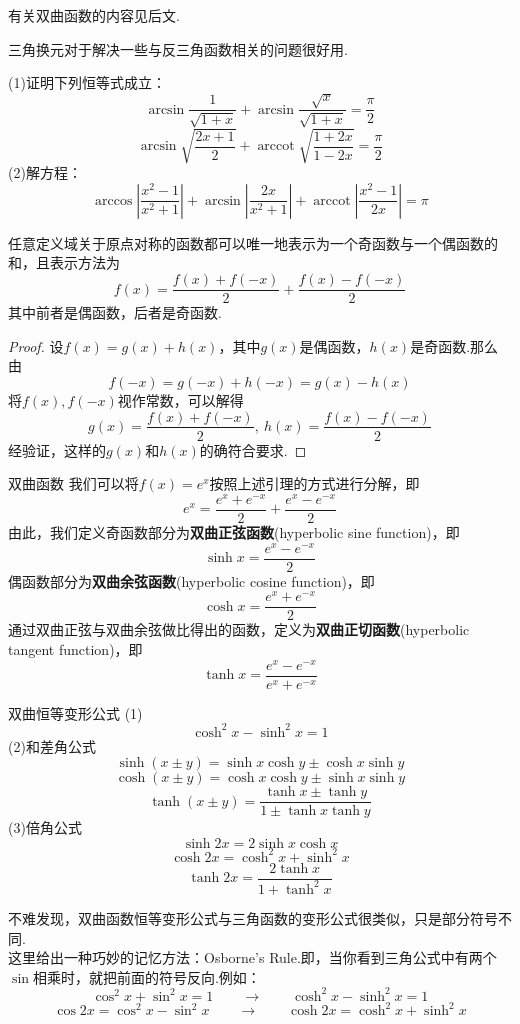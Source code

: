 \documentclass[lang=cn, zihao=5]{elegantbook}
\DeclareMathOperator{\arccot}{arccot}
\begin{document}
\begin{remark}
	有关双曲函数的内容见后文.
\end{remark}

三角换元对于解决一些与反三角函数相关的问题很好用.

\begin{example}
	(1)证明下列恒等式成立：
	$$\arcsin \frac{1}{\sqrt{1+x}} + \arcsin \frac{\sqrt{x}}{\sqrt{1+x}} = \frac{\pi}{2}$$
	$$\arcsin \sqrt{\frac{2x+1}{2}} + \arccot \sqrt{\frac{1+2x}{1-2x}} = \frac{\pi}{2}$$
	(2)解方程：$$\arccos \left| \frac{x^2-1}{x^2+1} \right| + \arcsin \left| \frac{2x}{x^2+1} \right| + \arccot \left| \frac{x^2-1}{2x} \right| = \pi$$
\end{example}

\begin{lemma}
    任意定义域关于原点对称的函数都可以唯一地表示为一个奇函数与一个偶函数的和，且表示方法为$$f(x)=\frac{f(x)+f(-x)}{2}+\frac{f(x)-f(-x)}{2}$$
    其中前者是偶函数，后者是奇函数.
\end{lemma}
\begin{proof}
    设$f(x)=g(x)+h(x)$，其中$g(x)$是偶函数，$h(x)$是奇函数.那么由$$f(-x) = g(-x) + h(-x) = g(x) - h(x)$$
    将$f(x),f(-x)$视作常数，可以解得$$g(x) = \frac{f(x)+f(-x)}{2},~h(x) = \frac{f(x)-f(-x)}{2}$$
    经验证，这样的$g(x)$和$h(x)$的确符合要求.
\end{proof}

\begin{definition}{双曲函数}
    我们可以将$f(x)=e^x$按照上述引理的方式进行分解，即$$e^x=\frac{e^x+e^{-x}}{2}+\frac{e^x-e^{-x}}{2}$$
    由此，我们定义奇函数部分为\textbf{双曲正弦函数}(hyperbolic sine function)，即$$\sinh{x}=\frac{e^x-e^{-x}}{2}$$
    偶函数部分为\textbf{双曲余弦函数}(hyperbolic cosine function)，即$$\cosh{x}=\frac{e^x+e^{-x}}{2}$$
    通过双曲正弦与双曲余弦做比得出的函数，定义为\textbf{双曲正切函数}(hyperbolic tangent function)，即$$\tanh{x}=\frac{e^x-e^{-x}}{e^x+e^{-x}}$$
\end{definition}

\begin{proposition}{双曲恒等变形公式}
    (1)$$\cosh^2{x}-\sinh^2{x}=1$$
    (2)和差角公式
    $$\sinh{(x \pm y)}=\sinh{x}\cosh{y} \pm \cosh{x}\sinh{y}$$
    $$\cosh{(x \pm y)}=\cosh{x}\cosh{y} \pm \sinh{x}\sinh{y}$$
    $$\tanh{(x \pm y)}=\frac{\tanh{x} \pm \tanh{y}}{1 \pm \tanh{x}\tanh{y}}$$
    (3)倍角公式
    $$\sinh{2x}=2\sinh{x}\cosh{x}$$
    $$\cosh{2x}=\cosh^2{x}+\sinh^2{x}$$
    $$\tanh{2x}=\frac{2\tanh{x}}{1+\tanh^2{x}}$$
\end{proposition}
\begin{remark}
    不难发现，双曲函数恒等变形公式与三角函数的变形公式很类似，只是部分符号不同.\\
    这里给出一种巧妙的记忆方法：Osborne's Rule.即，当你看到三角公式中有两个$\sin$相乘时，就把前面的符号反向.例如：$$\cos^2{x}+\sin^2{x}=1 \qquad \longrightarrow \qquad \cosh^2{x}-\sinh^2{x}=1$$
    $$\cos{2x}=\cos^2{x}-\sin^2{x} \qquad \longrightarrow \qquad \cosh{2x}=\cosh^2{x}+\sinh^2{x}$$
\end{remark}
\end{document}
